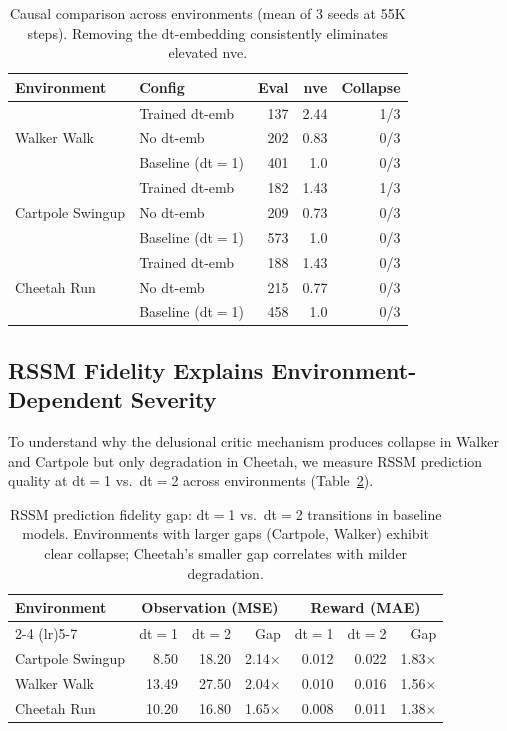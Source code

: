 \documentclass[letterpaper]{article}
\begin{document}
\begin{table}[t]
\centering
\caption{Causal comparison across environments (mean of 3 seeds at 55K steps). Removing the dt-embedding consistently eliminates elevated nve.}
\label{tab:causal_crossenv}
\small
\begin{tabular}{llrrr}
\toprule
\textbf{Environment} & \textbf{Config} & \textbf{Eval} & \textbf{nve} & \textbf{Collapse} \\
\midrule
\multirow{3}{*}{Walker Walk} & Trained dt-emb & 137 & 2.44 & 1/3 \\
 & No dt-emb & 202 & 0.83 & 0/3 \\
 & Baseline (dt$=$1) & 401 & 1.0 & 0/3 \\
\midrule
\multirow{3}{*}{Cartpole Swingup} & Trained dt-emb & 182 & 1.43 & 1/3 \\
 & No dt-emb & 209 & 0.73 & 0/3 \\
 & Baseline (dt$=$1) & 573 & 1.0 & 0/3 \\
\midrule
\multirow{3}{*}{Cheetah Run} & Trained dt-emb & 188 & 1.43 & 0/3 \\
 & No dt-emb & 215 & 0.77 & 0/3 \\
 & Baseline (dt$=$1) & 458 & 1.0 & 0/3 \\
\bottomrule
\end{tabular}
\end{table}

\subsection{RSSM Fidelity Explains Environment-Dependent Severity}
\label{sec:rssm_fidelity}

To understand why the delusional critic mechanism produces collapse in Walker and Cartpole but only degradation in Cheetah, we measure RSSM prediction quality at dt$=$1 vs.\ dt$=$2 across environments (Table~\ref{tab:rssm_fidelity}).

\begin{table}[t]
\centering
\caption{RSSM prediction fidelity gap: dt$=$1 vs.\ dt$=$2 transitions in baseline models. Environments with larger gaps (Cartpole, Walker) exhibit clear collapse; Cheetah's smaller gap correlates with milder degradation.}
\label{tab:rssm_fidelity}
\small
\begin{tabular}{lrrrrrr}
\toprule
\textbf{Environment} & \multicolumn{3}{c}{\textbf{Observation (MSE)}} & \multicolumn{3}{c}{\textbf{Reward (MAE)}} \\
\cmidrule(lr){2-4} \cmidrule(lr){5-7}
 & dt$=$1 & dt$=$2 & Gap & dt$=$1 & dt$=$2 & Gap \\
\midrule
Cartpole Swingup & 8.50 & 18.20 & 2.14$\times$ & 0.012 & 0.022 & 1.83$\times$ \\
Walker Walk & 13.49 & 27.50 & 2.04$\times$ & 0.010 & 0.016 & 1.56$\times$ \\
Cheetah Run & 10.20 & 16.80 & 1.65$\times$ & 0.008 & 0.011 & 1.38$\times$ \\
\bottomrule
\end{tabular}
\end{table}
\end{document}
